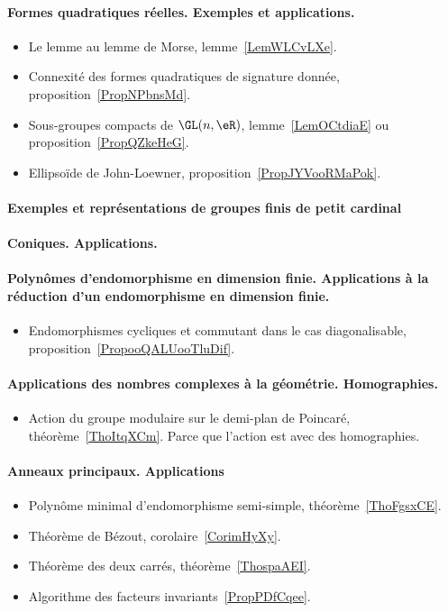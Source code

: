 \paragraph{Formes quadratiques réelles. Exemples et applications.}
\begin{itemize}
    \item Le lemme au lemme de Morse, lemme~\ref{LemWLCvLXe}.
    \item Connexité des formes quadratiques de signature donnée, proposition~\ref{PropNPbnsMd}.
    \item Sous-groupes compacts de \( \GL(n,\eR)\), lemme~\ref{LemOCtdiaE} ou proposition~\ref{PropQZkeHeG}.
    \item Ellipsoïde de John-Loewner, proposition~\ref{PropJYVooRMaPok}.
\end{itemize}
\paragraph{Exemples et représentations de groupes finis de petit cardinal}
\paragraph{Coniques. Applications.}
\paragraph{Polynômes d'endomorphisme en dimension finie. Applications à la réduction d'un endomorphisme en dimension finie.}
\begin{itemize}
    \item Endomorphismes cycliques et commutant dans le cas diagonalisable, proposition~\ref{PropooQALUooTluDif}.
\end{itemize}
\paragraph{Applications des nombres complexes à la géométrie. Homographies.}
\begin{itemize}
    \item Action du groupe modulaire sur le demi-plan de Poincaré, théorème~\ref{ThoItqXCm}. Parce que l'action est avec des homographies.
\end{itemize}

\paragraph{Anneaux principaux. Applications}
\begin{itemize}
    \item Polynôme minimal d'endomorphisme semi-simple, théorème~\ref{ThoFgsxCE}.
    \item Théorème de Bézout, corolaire~\ref{CorimHyXy}.
    \item Théorème des deux carrés, théorème~\ref{ThospaAEI}.
    \item Algorithme des facteurs invariants~\ref{PropPDfCqee}.
\end{itemize}
